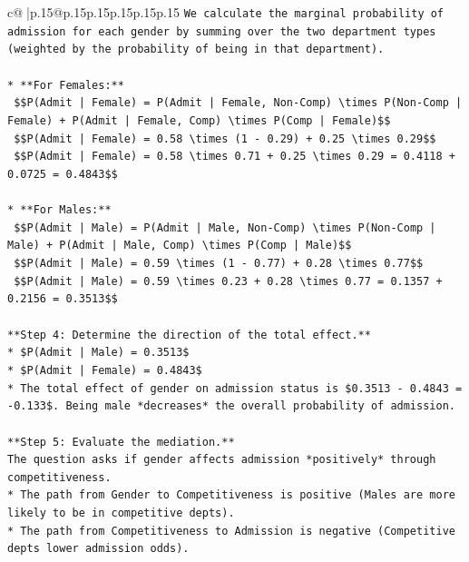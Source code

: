\documentclass{article}
\begin{document}
{\begin{supertabular}{c@{$\;$}|p{.15\linewidth}@{}p{.15\linewidth}p{.15\linewidth}p{.15\linewidth}p{.15\linewidth}p{.15\linewidth}}
{{{\texttt{We calculate the marginal probability of admission for each gender by summing over the two department types (weighted by the probability of being in that department).} \\
\\ 
\texttt{*   **For Females:**} \\
\texttt{    \$\$P(Admit | Female) = P(Admit | Female, Non{-}Comp) \textbackslash{}times P(Non{-}Comp | Female) + P(Admit | Female, Comp) \textbackslash{}times P(Comp | Female)\$\$} \\
\texttt{    \$\$P(Admit | Female) = 0.58 \textbackslash{}times (1 {-} 0.29) + 0.25 \textbackslash{}times 0.29\$\$} \\
\texttt{    \$\$P(Admit | Female) = 0.58 \textbackslash{}times 0.71 + 0.25 \textbackslash{}times 0.29 = 0.4118 + 0.0725 = 0.4843\$\$} \\
\\ 
\texttt{*   **For Males:**} \\
\texttt{    \$\$P(Admit | Male) = P(Admit | Male, Non{-}Comp) \textbackslash{}times P(Non{-}Comp | Male) + P(Admit | Male, Comp) \textbackslash{}times P(Comp | Male)\$\$} \\
\texttt{    \$\$P(Admit | Male) = 0.59 \textbackslash{}times (1 {-} 0.77) + 0.28 \textbackslash{}times 0.77\$\$} \\
\texttt{    \$\$P(Admit | Male) = 0.59 \textbackslash{}times 0.23 + 0.28 \textbackslash{}times 0.77 = 0.1357 + 0.2156 = 0.3513\$\$} \\
\\ 
\texttt{**Step 4: Determine the direction of the total effect.**} \\
\texttt{*   \$P(Admit | Male) = 0.3513\$} \\
\texttt{*   \$P(Admit | Female) = 0.4843\$} \\
\texttt{*   The total effect of gender on admission status is \$0.3513 {-} 0.4843 = {-}0.133\$. Being male *decreases* the overall probability of admission.} \\
\\ 
\texttt{**Step 5: Evaluate the mediation.**} \\
\texttt{The question asks if gender affects admission *positively* through competitiveness.} \\
\texttt{*   The path from Gender to Competitiveness is positive (Males are more likely to be in competitive depts).} \\
\texttt{*   The path from Competitiveness to Admission is negative (Competitive depts lower admission odds).} \\
}}}
\end{supertabular}}
\end{document}
